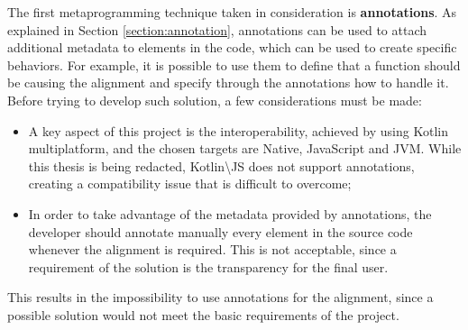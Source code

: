 The first metaprogramming technique taken in consideration is \textbf{annotations}. As explained in Section \ref{section:annotation}, annotations can be used to attach additional metadata to elements in the code, which can be used to create specific behaviors. For example, it is possible to use them to define that a function should be causing the alignment and specify through the annotations how to handle it.\newline
Before trying to develop such solution, a few considerations must be made:
\begin{itemize}
    \item A key aspect of this project is the interoperability, achieved by using Kotlin multiplatform, and the chosen targets are Native, JavaScript and JVM. While this thesis is being redacted, Kotlin\textbackslash JS does not support annotations, creating a compatibility issue that is difficult to overcome;
    \item In order to take advantage of the metadata provided by annotations, the developer should annotate manually every element in the source code whenever the alignment is required. This is not acceptable, since a requirement of the solution is the transparency for the final user.
\end{itemize}
This results in the impossibility to use annotations for the alignment, since a possible solution would not meet the basic requirements of the project.

